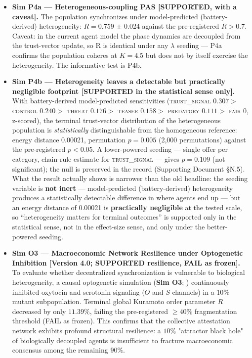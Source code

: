 \documentclass[11pt,twocolumn]{article}
\providecommand{\tightlist}{\setlength{\itemsep}{0pt}\setlength{\parskip}{0pt}}
\begin{document}
\begin{itemize}
\tightlist
\item
  \textbf{Sim P4a --- Heterogeneous-coupling PAS {[}SUPPORTED, with a
  caveat{]}.} The population synchronizes under model-predicted (battery-derived) heterogeneity:
  \(R = 0.759\) \(\pm\) 0.024 against the pre-registered \(R > 0.7.\)
  Caveat: in the current agent model the phase
  dynamics are decoupled from the trust-vector update, so R is identical
  under any \(\lambda\) seeding --- P4a confirms the population coheres
  at \(K = 4.5\) but does not by itself exercise the heterogeneity. The
  informative test is P4b.
\item
  \textbf{Sim P4b --- Heterogeneity leaves a detectable but practically
  negligible footprint {[}SUPPORTED in the statistical sense only{]}.} With battery-derived
  model-predicted sensitivities (\textsc{trust\_signal} \(0.307 >\) \textsc{control}
  \(0.240 >\) \textsc{threat} \(0.176 >\) \textsc{teaser} \(0.158 >\)
  \textsc{predatory} \(0.111 >\) \textsc{fair} \(0\), z-scored), the
  terminal trust-vector distribution of the heterogeneous population is
  \emph{statistically} distinguishable from the homogeneous reference:
  energy distance 0.00021, permutation \(p = 0.005\) (2,000
  permutations) against the pre-registered \(p < 0.05.\) A lower-powered
  seeding --- single offer per category, chain-rule estimate for
  \textsc{trust\_signal} --- gives \(p = 0.109\) (not significant); the
  null is preserved in the record (Supporting Document §N.5). What the result
  actually shows is narrower than the old headline: the seeding variable
  is \textbf{not inert} --- model-predicted (battery-derived) heterogeneity produces a
  statistically detectable difference in where agents end up --- but an
  energy distance of 0.00021 is \textbf{practically negligible} at the
  tested scale, so ``heterogeneity matters for terminal outcomes'' is
  supported only in the statistical sense, not in the effect-size sense,
  and only under the better-powered seeding.
\item
  \textbf{Sim O3 --- Macroeconomic Network Resilience under Optogenetic Inhibition [Version 4.0; SUPPORTED resilience, FAIL as frozen].}
  To evaluate whether decentralized synchronization is vulnerable to biological heterogeneity, a causal optogenetic simulation (\textbf{Sim O3}; \citealp{evans2016}) continuously inhibited oxytocin and serotonin signaling ($O$ and $S$ channels) in a $10\%$ mutant subpopulation. Terminal global Kuramoto order parameter $R$ decreased by only $11.39\%$, failing the pre-registered $\ge 40\%$ fragmentation threshold (FAIL as frozen). This confirms that the collective attestation network exhibits profound structural resilience: a $10\%$ "attractor black hole" of biologically decoupled agents is insufficient to fracture macroeconomic consensus among the remaining $90\%$.
\end{itemize}
\end{document}
